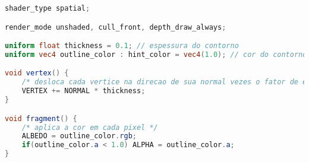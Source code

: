 \label{an:codigo-fonte-contorno-glsl}



\begin{lstlisting}[language=GLSL, caption={\label{cf:outline} Shader GLSL 3D simples para efeito de contorno}]
shader_type spatial;

render_mode unshaded, cull_front, depth_draw_always; 

uniform float thickness = 0.1; // espessura do contorno
uniform vec4 outline_color : hint_color = vec4(1.0); // cor do contorno

void vertex() {
    /* desloca cada vertice na direcao de sua normal vezes o fator de espessura */
	VERTEX += NORMAL * thickness; 
}

void fragment() {
    /* aplica a cor em cada pixel */
	ALBEDO = outline_color.rgb;
	if(outline_color.a < 1.0) ALPHA = outline_color.a;
}
\end{lstlisting}

\nocite{outlineGLSL}

